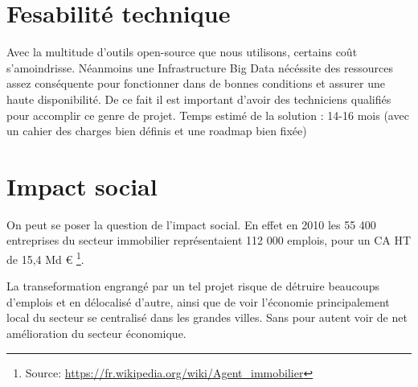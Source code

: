 \documentclass[12pt]{report}
\begin{document}
\section{Fesabilité technique}
Avec la multitude d'outils open-source que nous utilisons, certains coût s'amoindrisse. Néanmoins une Infrastructure
Big Data nécéssite des ressources assez conséquente pour fonctionner dans de bonnes conditions et assurer une haute
disponibilité. De ce fait il est important d'avoir des techniciens qualifiés pour accomplir ce genre de projet.
Temps estimé de la solution : 14-16 mois (avec un cahier des charges bien définis et une roadmap bien fixée)


\section{Impact social}
On peut se poser la question de l'impact social.
En effet en 2010 les 55 400 entreprises du secteur immobilier représentaient
112 000 emplois, pour un CA HT de 15,4 Md \euro{}
\footnote{Source: \url{https://fr.wikipedia.org/wiki/Agent_immobilier}}.

La transeformation engrangé par un tel projet risque de détruire beaucoups
d'emplois et en délocalisé d'autre, ainsi que de voir l'économie principalement
local du secteur se centralisé dans les grandes villes. Sans pour autent voir de
net amélioration du secteur économique. 
\end{document}
